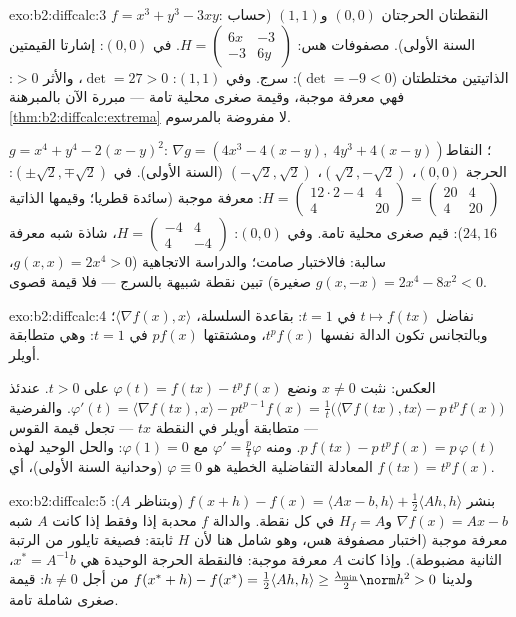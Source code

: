 \begin{solution}{exo:b2:diffcalc:3}
$f = x^3 + y^3 - 3xy$: النقطتان الحرجتان $(0,0)$ و$(1,1)$ (حساب السنة الأولى). مصفوفات
هس: $H = \begin{pmatrix} 6x & -3\\ -3 &
6y\end{pmatrix}$. في $(0,0)$: إشارتا القيمتين الذاتيتين مختلطتان ($\det = -9 < 0$):
سرج. وفي $(1,1)$: $\det = 27 > 0$، والأثر $> 0$: فهي معرفة موجبة، وقيمة صغرى
محلية تامة --- مبررة الآن بالمبرهنة \cref{thm:b2:diffcalc:extrema} لا مفروضة بالمرسوم.

$g = x^4 + y^4 - 2(x-y)^2$: $\nabla g = (4x^3 - 4(x - y),\; 4y^3 +
4(x-y))$؛ النقاط الحرجة $(0,0)$، $(\sqrt2, -\sqrt2)$،
$(-\sqrt2, \sqrt2)$ (السنة الأولى). في $(\pm\sqrt2, \mp\sqrt2)$: $H =
\begin{pmatrix} 12\cdot2 - 4 & 4\\ 4 & 20\end{pmatrix} =
\begin{pmatrix} 20 & 4\\ 4 & 20\end{pmatrix}$: معرفة موجبة (سائدة قطريا؛
وقيمها الذاتية $24, 16$): قيم صغرى محلية تامة.
وفي $(0,0)$: $H = \begin{pmatrix} -4 & 4\\ 4 & -4\end{pmatrix}$،
شاذة شبه معرفة سالبة: فالاختبار صامت؛ والدراسة الاتجاهية
($g(x,x) = 2x^4 > 0$، $g(x,-x) = 2x^4 - 8x^2 < 0$ صغيرة) تبين نقطة شبيهة بالسرج --- فلا قيمة قصوى.
\end{solution}

\begin{solution}{exo:b2:diffcalc:4}
نفاضل $t \mapsto f(tx)$ في $t = 1$: بقاعدة السلسلة،
$\langle \nabla f(x), x\rangle$؛ وبالتجانس تكون الدالة نفسها $t^pf(x)$، ومشتقتها $pf(x)$ في $t = 1$:
وهي متطابقة أويلر.

العكس: نثبت $x \neq 0$ ونضع $\varphi(t) = f(tx) - t^p f(x)$ على $t > 0$. عندئذ $\varphi'(t) = \langle\nabla f(tx), x\rangle -
pt^{p-1}f(x) = \frac1t\bigl(\langle \nabla f(tx), tx\rangle -
p\,t^pf(x)\bigr)$. والفرضية ---
متطابقة أويلر في النقطة $tx$ --- تجعل قيمة القوس $p\,f(tx) - p\,t^pf(x) =
p\,\varphi(t)$. ومنه
$\varphi' = \frac{p}{t}\varphi$ مع $\varphi(1)
= 0$: والحل الوحيد لهذه المعادلة التفاضلية الخطية هو
$\varphi \equiv 0$ (وحدانية السنة الأولى)، أي $f(tx) = t^pf(x)$.
\end{solution}

\begin{solution}{exo:b2:diffcalc:5}
بنشر $f(x + h) - f(x) = \langle Ax - b, h\rangle +
\frac12\langle Ah, h\rangle$ (وبتناظر $A$): $\nabla f(x) = Ax -
b$ و$H_f = A$ في كل نقطة. والدالة $f$
محدبة إذا وفقط إذا كانت $A$ شبه معرفة موجبة (اختبار مصفوفة هس،
وهو شامل هنا لأن $H$ ثابتة: فصيغة تايلور من الرتبة الثانية
مضبوطة). وإذا كانت $A$ معرفة موجبة: فالنقطة الحرجة الوحيدة هي
$x^* = A^{-1}b$، ولدينا $f(x^*
+ h) - f(x^*) = \frac12\langle Ah, h\rangle \geq
\frac{\lambda_{\min}}{2}\norm h^2 > 0$ من أجل $h \neq 0$: قيمة صغرى شاملة تامة.
\end{solution}

